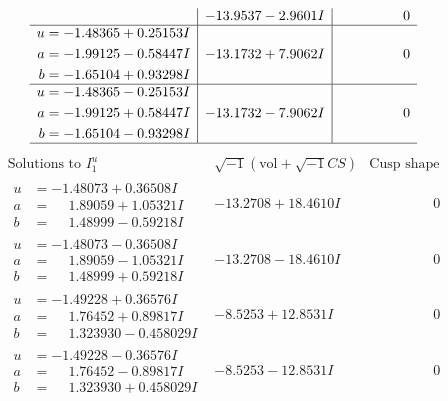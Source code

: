\documentclass[1p]{elsarticle_modified}
\theoremstyle{definition}
\newcommand{\I}{\sqrt{-1}}
\begin{document}
$$\begin{array}{c|c|c}
 & -13.9537 - 2.9601 I & \phantom{-0.000000 } 0 \\ \hline\begin{aligned}
u &= -1.48365 + 0.25153 I \\
a &= -1.99125 - 0.58447 I \\
b &= -1.65104 + 0.93298 I\end{aligned}
 & -13.1732 + 7.9062 I & \phantom{-0.000000 } 0 \\ \hline\begin{aligned}
u &= -1.48365 - 0.25153 I \\
a &= -1.99125 + 0.58447 I \\
b &= -1.65104 - 0.93298 I\end{aligned}
 & -13.1732 - 7.9062 I & \phantom{-0.000000 } 0\\
 \hline 
 \end{array}$$\newpage$$\begin{array}{c|c|c}  
\text{Solutions to }I^u_{1}& \I (\text{vol} + \sqrt{-1}CS) & \text{Cusp shape}\\
 \hline 
\begin{aligned}
u &= -1.48073 + 0.36508 I \\
a &= \phantom{-}1.89059 + 1.05321 I \\
b &= \phantom{-}1.48999 - 0.59218 I\end{aligned}
 & -13.2708 + 18.4610 I & \phantom{-0.000000 } 0 \\ \hline\begin{aligned}
u &= -1.48073 - 0.36508 I \\
a &= \phantom{-}1.89059 - 1.05321 I \\
b &= \phantom{-}1.48999 + 0.59218 I\end{aligned}
 & -13.2708 - 18.4610 I & \phantom{-0.000000 } 0 \\ \hline\begin{aligned}
u &= -1.49228 + 0.36576 I \\
a &= \phantom{-}1.76452 + 0.89817 I \\
b &= \phantom{-}1.323930 - 0.458029 I\end{aligned}
 & -8.5253 + 12.8531 I & \phantom{-0.000000 } 0 \\ \hline\begin{aligned}
u &= -1.49228 - 0.36576 I \\
a &= \phantom{-}1.76452 - 0.89817 I \\
b &= \phantom{-}1.323930 + 0.458029 I\end{aligned}
 & -8.5253 - 12.8531 I & \phantom{-0.000000 } 0 \\ \hline\begin{aligned}

\end{aligned}
\end{array}$$
\end{document}
